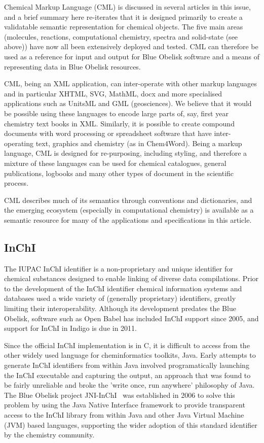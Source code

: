 \documentclass[10pt]{bmc_article}
\newenvironment{bmcformat}{\fussy\setboolean{publ}{true}}{\fussy}
\begin{document}
\begin{bmcformat}
Chemical Markup Language (CML) is discussed in several articles in this
issue, and a brief summary here re-iterates that it is designed
primarily to create a validatable semantic representation for chemical
objects. The five main areas (molecules, reactions, computational
chemistry, spectra and solid-state (see above)) have now all been
extensively deployed and tested. CML can therefore be used as a
reference for input and output for Blue Obelisk software and a means
of representing data in Blue Obelisk resources.

CML, being an XML application, can inter-operate with other markup
languages and in particular XHTML, SVG, MathML, docx and more
specialised applications such as UnitsML and GML (geosciences). We
believe that it would be possible using these languages to encode
large parts of, say, first year chemistry text books in XML.
Similarly, it is possible to create compound documents with word
processing or spreadsheet software that have inter-operating text,
graphics and chemistry (as in Chem4Word). Being a markup language, CML
is designed for re-purposing, including styling, and therefore a
mixture of these languages can be used for chemical catalogues,
general publications, logbooks and many other types of document in the
scientific process.

CML describes much of its semantics through conventions and
dictionaries, and the emerging ecosystem (especially in computational
chemistry) is available as a semantic resource for many of the
applications and specifications in this article.


  \subsection*{InChI}

The IUPAC InChI identifier is a non-proprietary and unique identifier
for chemical substances designed to enable linking of diverse data
compilations. Prior to the development of the InChI identifier chemical
information systems and databases used a wide variety of (generally
proprietary) identifiers, greatly limiting their interoperability.
Although its development predates the Blue Obelisk, software such as Open
Babel has included InChI support since 2005, and support for InChI in
Indigo is due in 2011.

Since the official InChI implementation is in C, it is difficult to
access from the other widely used language for cheminformatics
toolkits, Java. Early attempts to generate InChI identifiers from
within Java involved programatically launching the InChI executable
and capturing the output, an approach that was found to be fairly
unreliable and broke the 'write once, run anywhere' philosophy
of Java.  The Blue Obelisk project JNI-InChI~\cite{WebJNIInChI}
was established in 2006 to solve this problem by using the Java Native
Interface framework to provide transparent access to the InChI
library from within Java and other Java Virtual Machine (JVM) based
languages, supporting the wider adoption of
this standard identifier by the chemistry community.


\end{bmcformat}
\end{document}
